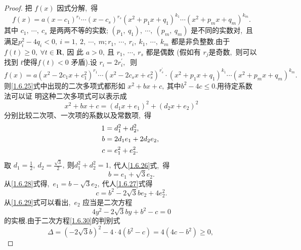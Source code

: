 \begin{proof}
	把 $ f(x) $ 因式分解,\  得
	$$f(x)=a\left(x-c_{1}\right)^{r_{1}} \cdots\left(x-c_{s}\right)^{r_{s}}\left(x^{2}+p_{1} x+q_{1}\right)^{k_{1}} \cdots\left(x^{2}+p_{m} x+q_{m}\right)^{k_{m}} .$$
	其中 $ c_{1},\  \cdots,\  c_{s} $ 是两两不等的实数;  $\left(p_{1},\  q_{1}\right),\  \cdots,\ \left(p_{m},\  q_{m}\right) $ 是不同的实数对,\  且满足$  p_{i}^{2}-4 q_{i}<0,\  i=1,\ 2,\  \cdots,\  m ; r_{1},\  \cdots,\  r_{i},\  k_{1},\  \cdots,\  k_{m} $ 都是非负整数.由于 $ f(t) \geqslant 0,\  \forall t \in \mathbf{R} ,\  $因 此  $a>0 ,\  $且 $ r_{1},\  \cdots,\  r_{s} $ 都是偶数 (假如有  $r_{j}  $是奇数,\  则可以找到 $ t  $使得$  f(t)<0 $ 矛盾).设 $ r_{i}=2 r_{i}^{\prime} ,\ $ 则
	\begin{equation}
		f(x)=a\left(x^{2}-2 c_{1} x+c_{1}^{2}\right)^{r_{1}} \cdots\left(x^{2}-2 c_{s} x+c_{s}^{2}\right)^{r_{s}^{\prime}}\cdot\left(x^{2}+p_{1} x+q_{1}\right)^{k_{1}} \cdots\left(x^{2}+p_{m} x+q_{m}\right)^{k_{m}} .\label{1.6.25}
	\end{equation}
	则\eqref{1.6.25}式中出现的二次多项式都形如 $ x^{2}+b x+c ,\  $其中$  b^{2}-4 c \leqslant 0  .$用待定系数法可以证 明这种二次多项式可以表示成
	\begin{equation}
		x^{2}+b x+c=\left(d_{1} x+e_{1}\right)^{2}+\left(d_{2} x+e_{2}\right)^{2} \label{1.6.251}
	\end{equation}
	分别比较二次项、一次项的系数以及常数项,\  得
	\begin{align}
		1 & =d_{1}^{2}+d_{2}^{2},\  \notag\\
		b & =2 d_{1} e_{1}+2 d_{2} e_{2},\  \label{1.6.26}\\
		c & =e_{1}^{2}+e_{2}^{2} .\label{1.6.27}
	\end{align}
	取  $d_{1}=\frac{1}{2},\  d_{2}=\frac{\sqrt{3}}{2} ,\  则  d_{1}^{2}+d_{2}^{2}=1 ,\  $代人\eqref{1.6.26}式,\  得
	\begin{equation}
		b=e_{1}+\sqrt{3} e_{2} .\label{1.6.28}
	\end{equation}
	从\eqref{1.6.28}式得,\   $e_{1}=b-\sqrt{3} e_{2} ,\  $代人\eqref{1.6.27}式得
	\begin{equation}
		c=b^{2}-2 \sqrt{3} b e_{2}+4 e_{2}^{2} .\label{1.6.29}
	\end{equation}
	从\eqref{1.6.29}式可以看出,\  $ e_{2}$  应当是二次方程
	\begin{equation}
		4 y^{2}-2 \sqrt{3} b y+b^{2}-c=0\label{1.6.30}
	\end{equation}
	的实根.由于二次方程\eqref{1.6.30}的判别式
	$$\Delta=(-2 \sqrt{3} b)^{2}-4 \cdot 4\left(b^{2}-c\right)=4\left(4 c-b^{2}\right) \geqslant 0,\ $$

\end{proof}

